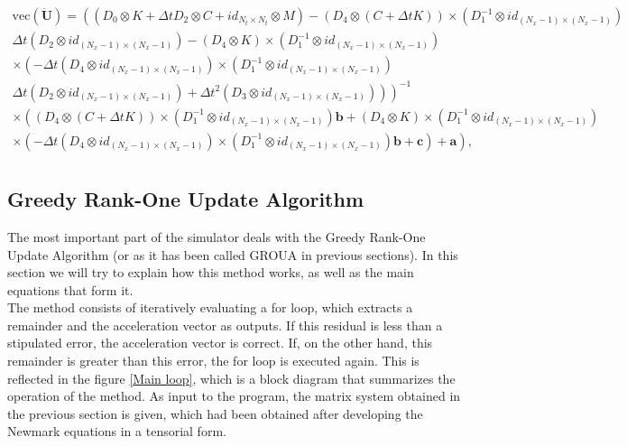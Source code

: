 \documentclass[a4paper, 10pt]{article}
\begin{document}
$$
\begin{array}{c}
\mathrm{vec}(\ddot{\mathbf{U}}) = \left(\left(D_0 \otimes K + \Delta t D_2 \otimes C + id_{N_t \times N_t} \otimes  M  \right) - \left(D_4 \otimes  \left(C+\Delta t K\right)\right) \times \left( D_1^{-1} \otimes  id_{(N_x-1)\times(N_x-1)}\right)   \right.\\
\left. \Delta t \left( D_2 \otimes  id_{(N_x-1)\times(N_x-1)}\right) -  \left( D_4 \otimes   K \right) \times \left( D_1^{-1} \otimes  id_{(N_x-1)\times(N_x-1)}\right) \right. \\
\left.  \times \left( - \Delta t \left(D_4 \otimes  id_{(N_x-1)\times(N_x-1)} \right) \times \left( D_1^{-1} \otimes  id_{(N_x-1)\times(N_x-1)}\right) \right. \right. \\
\left. \left. \Delta t \left( D_2 \otimes  id_{(N_x-1)\times(N_x-1)}\right)  + \Delta t^2 \left( D_3 \otimes  id_{(N_x-1)\times(N_x-1)} \right) \right) \right)^{-1} \\
\times \left( \left(D_4 \otimes  \left( C + \Delta t K\right) \right) \times \left( D_1^{-1} \otimes  id_{(N_x-1)\times(N_x-1)}\right)  \mathbf{b} +\left( D_4 \otimes   K\right) \times \left( D_1^{-1} \otimes  id_{(N_x-1)\times(N_x-1)}\right) \right. \\
\left.  \times \left( - \Delta t \left(D_4 \otimes  id_{(N_x-1)\times(N_x-1)} \right) \times \left( D_1^{-1} \otimes  id_{(N_x-1)\times(N_x-1)}\right) \mathbf{b}  + \mathbf{c}  \right) + \mathbf{a}  \right), \\
\end{array}
$$




\subsection{Greedy Rank-One Update Algorithm}

The most important part of the simulator deals with the Greedy Rank-One Update Algorithm (or as it has been called GROUA in previous sections). In this section we will try to explain how this method works, as well as the main equations that form it.\\

The method consists of iteratively evaluating a for loop, which extracts a remainder and the acceleration vector as outputs. If this residual is less than a stipulated error, the acceleration vector is correct. If, on the other hand, this remainder is greater than this error, the for loop is executed again. This is reflected in the figure \ref{Main loop}, which is a block diagram that summarizes the operation of the method. As input to the program, the matrix system obtained in the previous section is given, which had been obtained after developing the Newmark equations in a tensorial form.\\
\end{document}

